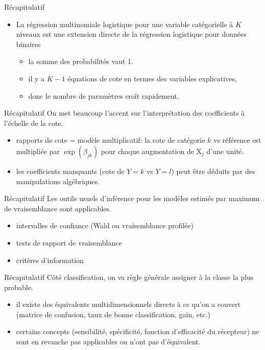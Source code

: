 \documentclass[
  ignorenonframetext,
]{beamer}
\providecommand{\tightlist}{%
  \setlength{\itemsep}{0pt}\setlength{\parskip}{0pt}}\usepackage{longtable,booktabs,array}
\begin{document}
\begin{frame}{Récapitulatif}
\protect\hypertarget{ruxe9capitulatif-2}{}
\begin{itemize}
\tightlist
\item
  La régression multinomiale logistique pour une variable catégorielle à
  \(K\) niveaux est une extension directe de la régression logistique
  pour données binaires

  \begin{itemize}
  \tightlist
  \item
    la somme des probabilités vaut 1.
  \item
    il y a \(K-1\) équations de cote en termes des variables
    explicatives,
  \item
    donc le nombre de paramètres croît rapidement.
  \end{itemize}
\end{itemize}
\end{frame}

\begin{frame}{Récapitulatif}
\protect\hypertarget{ruxe9capitulatif-3}{}
On met beaucoup l'accent sur l'interprétation des coefficients à
l'échelle de la cote.

\begin{itemize}
\tightlist
\item
  rapports de cote = modèle multiplicatif: la cote de catégorie \(k\) vs
  référence est multipliée par \(\exp(\beta_{jk})\) pour chaque
  augmentation de \(\mathrm{X}_j\) d'une unité.
\item
  les coefficients manquants (cote de \(Y=k\) vs \(Y=l\)) peut être
  déduits par des manipulations algébriques.
\end{itemize}
\end{frame}

\begin{frame}{Récapitulatif}
\protect\hypertarget{ruxe9capitulatif-4}{}
Les outils usuels d'inférence pour les modèles estimés par maximum de
vraisemblance sont applicables.

\begin{itemize}
\tightlist
\item
  intervalles de confiance (Wald ou vraisemblance profilée)
\item
  tests de rapport de vraisemblance
\item
  critères d'information
\end{itemize}
\end{frame}

\begin{frame}{Récapitulatif}
\protect\hypertarget{ruxe9capitulatif-5}{}
Côté classification, on va règle générale assigner à la classe la plus
probable.

\begin{itemize}
\tightlist
\item
  il existe des équivalents multidimensionnels directs à ce qu'on a
  couvert (matrice de confusion, taux de bonne classification, gain,
  etc.)
\item
  certains concepts (sensibilité, spécificité, fonction d'efficacité du
  récepteur) ne sont en revanche pas applicables ou n'ont pas
  d'équivalent.
\end{itemize}
\end{frame}
\end{document}
